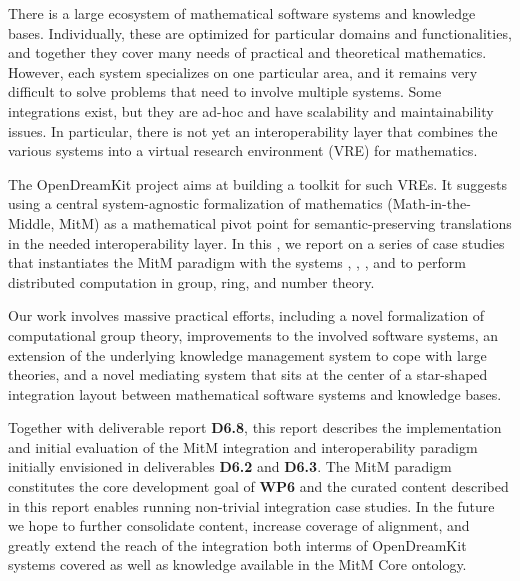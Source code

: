 There is a large ecosystem of mathematical software systems and knowledge bases.
Individually, these are optimized for particular domains and functionalities, and together they cover many needs of practical and theoretical mathematics.
However, each system specializes on one particular area, and it remains very difficult to solve problems that need to involve multiple systems.
Some integrations exist, but they are ad-hoc and have scalability and maintainability issues.
In particular, there is not yet an interoperability layer that combines the various systems into a virtual research environment (VRE) for mathematics.
  
The OpenDreamKit project aims at building a toolkit for such VREs.
It suggests using a central system-agnostic formalization of mathematics (Math-in-the-Middle, MitM) as a mathematical pivot point for semantic-preserving translations in the needed interoperability layer.
In this \papertype, we report on a series of case studies that instantiates the MitM paradigm with the systems \GAP, \Sage, \LMFDB, and \Singular to perform distributed computation in group, ring, and number theory.
 
Our work involves massive practical efforts, including a novel formalization of computational group theory, improvements to the involved software systems, an extension of the underlying knowledge management system to cope with large theories, and a novel mediating system that sits at the center of a star-shaped integration layout between mathematical software systems and knowledge bases.

Together with deliverable report \textbf{D6.8}, this report describes the implementation and initial evaluation of the MitM integration and interoperability paradigm initially envisioned in deliverables \textbf{D6.2} and \textbf{D6.3}.
The MitM paradigm constitutes the core development goal of \textbf{WP6} and the curated content described in this report enables running non-trivial integration case studies.
In the future we hope to further consolidate content, increase coverage of alignment, and greatly extend the reach of the integration both interms of OpenDreamKit systems covered as well as knowledge available in the MitM Core ontology.


